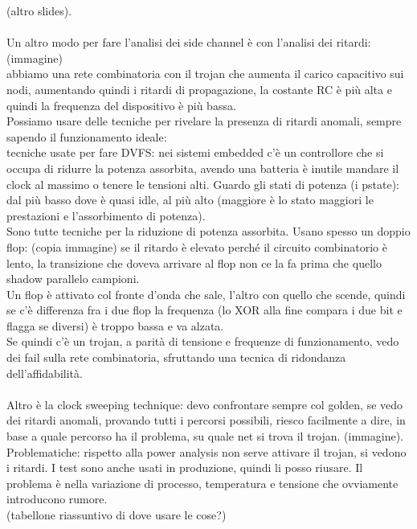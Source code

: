 \documentclass[oneside, 12pt]{extbook}
\begin{document}
(altro slides).\\\\Un altro modo per fare l'analisi dei side channel è con l'analisi dei ritardi: (immagine)\\abbiamo una rete combinatoria con il trojan che aumenta il carico capacitivo sui nodi, aumentando quindi i ritardi di propagazione, la costante RC è più alta e quindi la frequenza del dispositivo è più bassa.\\Possiamo usare delle tecniche per rivelare la presenza di ritardi anomali, sempre sapendo il funzionamento ideale:\\tecniche usate per fare DVFS: nei sistemi embedded c'è un controllore che si occupa di ridurre la potenza assorbita, avendo una batteria è inutile mandare il clock al massimo o tenere le tensioni alti. Guardo gli stati di potenza (i pstate): dal più basso dove è quasi idle, al più alto (maggiore è lo stato maggiori le prestazioni e l'assorbimento di potenza).\\Sono tutte tecniche per la riduzione di potenza assorbita. Usano spesso un doppio flop: (copia immagine) se il ritardo è elevato perché il circuito combinatorio è lento, la transizione che doveva arrivare al flop non ce la fa prima che quello shadow parallelo campioni.\\Un flop è attivato col fronte d'onda che sale, l'altro con quello che scende, quindi se c'è differenza fra i due flop la frequenza (lo XOR alla fine compara i due bit e flagga se diversi) è troppo bassa e va alzata.\\Se quindi c'è un trojan, a parità di tensione e frequenze di funzionamento, vedo dei fail sulla rete combinatoria, sfruttando una tecnica di ridondanza dell'affidabilità.\\\\Altro è la clock sweeping technique: devo confrontare sempre col golden, se vedo dei ritardi anomali, provando tutti i percorsi possibili, riesco facilmente a dire, in base a quale percorso ha il problema, su quale net si trova il trojan. (immagine).\\Problematiche: rispetto alla power analysis non serve attivare il trojan, si vedono i ritardi. I test sono anche usati in produzione, quindi li posso riusare. Il problema è nella variazione di processo, temperatura e tensione che ovviamente introducono rumore.\\ (tabellone riassuntivo di dove usare le cose?)
\end{document}
